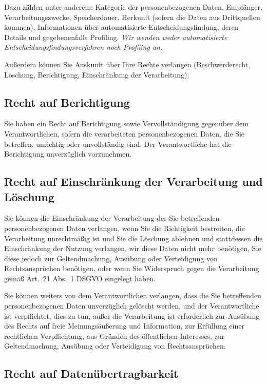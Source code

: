 \documentclass[a4paper, 10pt, headings=normal]{scrartcl}
\begin{document}
\begin{multicols*}{2}
Dazu zählen unter anderem: Kategorie der personenbezogenen Daten, Empfänger, Verarbeitungszwecke, Speicherdauer, Herkunft (sofern die Daten aus Drittquellen kommen), Informationen über automatisierte Entscheidungsfindung, deren Details und gegebenenfalls Profiling.
\emph{Wir wenden weder automatisierte Entscheidungsfindungsverfahren noch Profiling an.}

Außerdem können Sie Auskunft über Ihre Rechte verlangen (Beschwerderecht, Löschung, Berichtigung, Einschränkung der Verarbeitung).

\subsection{Recht auf Berichtigung}

Sie haben ein Recht auf Berichtigung sowie Vervollständigung gegenüber dem Verantwortlichen, sofern die verarbeiteten personenbezogenen Daten, die Sie betreffen, unrichtig oder unvollständig sind.
Der Verantwortliche hat die Berichtigung unverzüglich vorzunehmen.

\subsection{Recht auf Einschränkung der Verarbeitung und Löschung}

Sie können die Einschränkung der Verarbeitung der Sie betreffenden personenbezogenen Daten verlangen, wenn Sie die Richtigkeit bestreiten, die Verarbeitung unrechtmäßig ist und Sie die Löschung ablehnen und stattdessen die Einschränkung der Nutzung verlangen, wir diese Daten nicht mehr benötigen, Sie diese jedoch zur Geltendmachung, Ausübung oder Verteidigung von Rechtsansprüchen benötigen, oder wenn Sie Widerspruch gegen die Verarbeitung gemäß Art.~21 Abs.~1 DSGVO eingelegt haben.

Sie können weiters von dem Verantwortlichen verlangen, dass die Sie betreffenden personenbezogenen Daten unverzüglich gelöscht werden, und der Verantwortliche ist verpflichtet, dies zu tun, außer die Verarbeitung ist erforderlich zur Ausübung des Rechts auf freie Meinungsäußerung und Information, zur Erfüllung einer rechtlichen Verpflichtung, aus Gründen des öffentlichen Interesses, zur Geltendmachung, Ausübung oder Verteidigung von Rechtsansprüchen.

\subsection{Recht auf Datenübertragbarkeit}


\end{multicols*}
\end{document}

